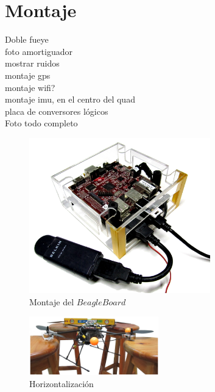 \documentclass[main]{subfiles}
\begin{document}
\chapter{Montaje}
\label{chap:camara}

Doble fueye\\
foto amortiguador\\
mostrar ruidos\\
montaje gps\\
montaje wifi?\\
montaje imu, en el centro del quad\\
placa de conversores lógicos\\
Foto todo completo\\


\begin{figure}[h!]
	\centering
		\includegraphics[width=0.7\textwidth]{./pics_montaje/beagle.jpg}
	\caption{Montaje del $BeagleBoard$}
	\label{fig:beagle}
\end{figure}


\begin{figure}
	\begin{center}
		\includegraphics[width=0.5\textwidth]{./pics_montaje/horizontalidad.jpg}
	\end{center}
	\caption{Horizontalización}
	\label{fig:horizontalidad}
\end{figure}
\end{document}

